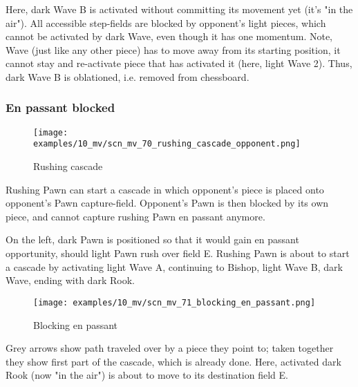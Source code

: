 Here, dark Wave B is activated without committing its movement yet (it's "in the air").
All accessible step-fields are blocked by opponent's light pieces, which cannot be
activated by dark Wave, even though it has one momentum.
Note, Wave (just like any other piece) has to move away from its starting position,
it cannot stay and re-activate piece that has activated it (here, light Wave 2).
Thus, dark Wave B is oblationed, i.e. removed from chessboard.

\clearpage %

\subsubsection*{En passant blocked}
\label{sec:Miranda's veil/Wave/Cascading opponent/En passant blocked}

\vspace*{-0.7\baselineskip}
\noindent
\begin{wrapfigure}[15]{l}{0.4\textwidth}
\centering
\texttt{[image: examples/10\_mv/scn\_mv\_70\_rushing\_cascade\_opponent.png]}
\vspace*{-1.4\baselineskip}
\caption{Rushing cascade}
\label{fig:scn_mv_70_rushing_cascade_opponent}
\end{wrapfigure}
Rushing Pawn can start a cascade in which opponent's piece is placed onto opponent's
Pawn capture-field.
Opponent's Pawn is then blocked by its own piece, and cannot capture rushing Pawn en
passant anymore.

On the left, dark Pawn is positioned so that it would gain en passant opportunity,
should light Pawn rush over field E. Rushing Pawn is about to start a cascade by
activating light Wave A, continuing to Bishop, light Wave B, dark Wave, ending
with dark Rook.


\noindent
\begin{wrapfigure}[7]{l}{0.4\textwidth}
\centering
\texttt{[image: examples/10\_mv/scn\_mv\_71\_blocking\_en\_passant.png]}
\vspace*{-1.4\baselineskip}
\caption{Blocking en passant}
\label{fig:scn_mv_71_blocking_en_passant}
\end{wrapfigure}
Grey arrows show path traveled over by a piece they point to; taken together they
show first part of the cascade, which is already done. \newline
\indent
Here, activated dark Rook (now "in the air") is about to move to its destination
field E.

